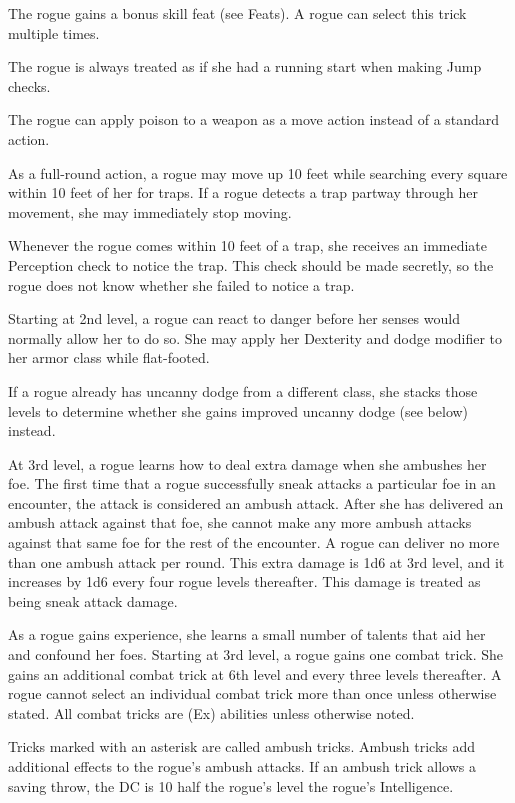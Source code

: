  The rogue gains a bonus skill feat (see Feats). A rogue can select this trick multiple times.

 The rogue is always treated as if she had a running start when making Jump checks.

 The rogue can apply poison to a weapon as a move action instead of a standard action.

 As a full-round action, a rogue may move up 10 feet while searching every square within 10 feet of her for traps. If a rogue detects a trap partway through her movement, she may immediately stop moving.

 Whenever the rogue comes within 10 feet of a trap, she receives an immediate Perception check to notice the trap. This check should be made secretly, so the rogue does not know whether she failed to notice a trap.

 Starting at 2nd level, a rogue can react to danger before her senses would normally allow her to do so. She may apply her Dexterity and dodge modifier to her armor class while flat-footed.

If a rogue already has uncanny dodge from a different class, she stacks those levels to determine whether she gains improved uncanny dodge (see below) instead.

 At 3rd level, a rogue learns how to deal extra damage when she ambushes her foe. The first time that a rogue successfully sneak attacks a particular foe in an encounter, the attack is considered an ambush attack. After she has delivered an ambush attack against that foe, she cannot make any more ambush attacks against that same foe for the rest of the encounter. A rogue can deliver no more than one ambush attack per round. This extra damage is 1d6 at 3rd level, and it increases by 1d6 every four rogue levels thereafter. This damage is treated as being sneak attack damage.

 As a rogue gains experience, she learns a small number of talents that aid her and confound her foes. Starting at 3rd level, a rogue gains one combat trick. She gains an additional combat trick at 6th level and every three levels thereafter. A rogue cannot select an individual combat trick more than once unless otherwise stated. All combat tricks are (Ex) abilities unless otherwise noted.

\par Tricks marked with an asterisk are called ambush tricks. Ambush tricks add additional effects to the rogue's ambush attacks. If an ambush trick allows a saving throw, the DC is 10 \add half the rogue's level \add the rogue's Intelligence.

